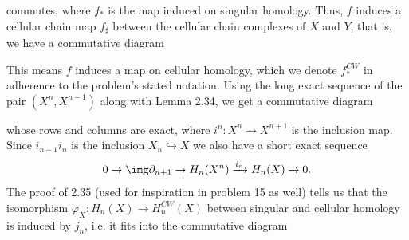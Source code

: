 \begin{homework}[e]
\begin{prf}
    commutes, where $f_*$ is the map induced on singular homology. Thus, $f$ induces a cellular chain map $f_{\sharp}$ between the cellular chain complexes of $X$ and $Y$, that is, we have a commutative diagram
    \begin{center}
    \end{center}
    This means $f$ induces a map on cellular homology, which we denote $f_*^{CW}$ in adherence to the problem's stated notation. Using the long exact sequence of the pair $(X^n,X^{n-1})$ along with Lemma 2.34, we get a commutative diagram
    \begin{center}
    \end{center}
    whose rows and columns are exact, where $i^n:X^n \to X^{n+1}$ is the inclusion map. Since $i_{n+1}i_{n}$ is the inclusion $X_n \hookrightarrow X$ we also have a short exact sequence
    \begin{align*}
      0 \to \img \partial_{n+1} \to H_n(X^n) \xrightarrow{i_n}H_n(X) \to 0.
    \end{align*}
  The proof of 2.35 (used for inspiration in problem 15 as well) tells us that the isomorphism $\varphi_X:H_n(X) \to H_n^{CW}(X)$ between singular and cellular homology is induced by $j_n$, i.e. it fits into the commutative diagram
  \begin{center}
\end{center}
\end{prf}
\end{homework}
